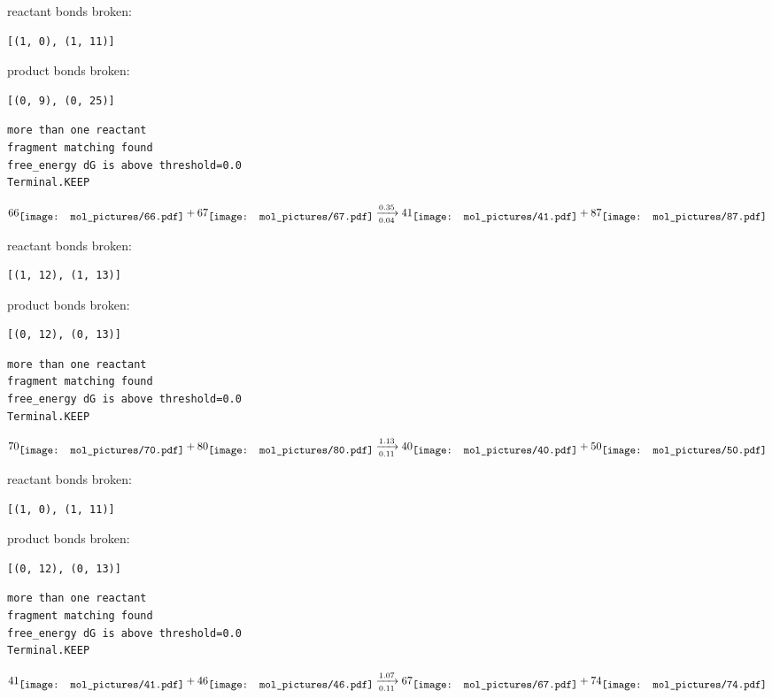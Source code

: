 \documentclass{article}
\begin{document}
reactant bonds broken:\begin{verbatim}
[(1, 0), (1, 11)]
\end{verbatim}
product bonds broken:\begin{verbatim}
[(0, 9), (0, 25)]
\end{verbatim}




\vspace{1cm}
\begin{verbatim}
more than one reactant
fragment matching found
free_energy dG is above threshold=0.0
Terminal.KEEP
\end{verbatim}
$$
66
\raisebox{-.5\height}{\texttt{[image: mol\_pictures/66.pdf]}}
+
67
\raisebox{-.5\height}{\texttt{[image: mol\_pictures/67.pdf]}}
\xrightarrow[0.04]{0.35}
41
\raisebox{-.5\height}{\texttt{[image: mol\_pictures/41.pdf]}}
+
87
\raisebox{-.5\height}{\texttt{[image: mol\_pictures/87.pdf]}}
$$


reactant bonds broken:\begin{verbatim}
[(1, 12), (1, 13)]
\end{verbatim}
product bonds broken:\begin{verbatim}
[(0, 12), (0, 13)]
\end{verbatim}




\vspace{1cm}
\begin{verbatim}
more than one reactant
fragment matching found
free_energy dG is above threshold=0.0
Terminal.KEEP
\end{verbatim}
$$
70
\raisebox{-.5\height}{\texttt{[image: mol\_pictures/70.pdf]}}
+
80
\raisebox{-.5\height}{\texttt{[image: mol\_pictures/80.pdf]}}
\xrightarrow[0.11]{1.13}
40
\raisebox{-.5\height}{\texttt{[image: mol\_pictures/40.pdf]}}
+
50
\raisebox{-.5\height}{\texttt{[image: mol\_pictures/50.pdf]}}
$$


reactant bonds broken:\begin{verbatim}
[(1, 0), (1, 11)]
\end{verbatim}
product bonds broken:\begin{verbatim}
[(0, 12), (0, 13)]
\end{verbatim}




\vspace{1cm}
\begin{verbatim}
more than one reactant
fragment matching found
free_energy dG is above threshold=0.0
Terminal.KEEP
\end{verbatim}
$$
41
\raisebox{-.5\height}{\texttt{[image: mol\_pictures/41.pdf]}}
+
46
\raisebox{-.5\height}{\texttt{[image: mol\_pictures/46.pdf]}}
\xrightarrow[0.11]{1.07}
67
\raisebox{-.5\height}{\texttt{[image: mol\_pictures/67.pdf]}}
+
74
\raisebox{-.5\height}{\texttt{[image: mol\_pictures/74.pdf]}}
$$
\end{document}
